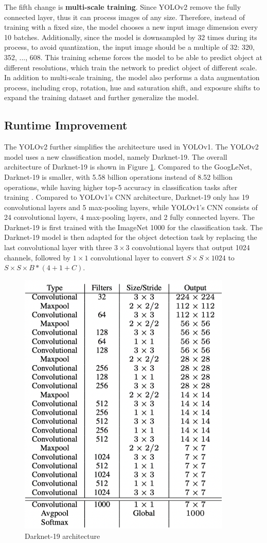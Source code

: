 The fifth change is \textbf{multi-scale training}. Since YOLOv2 remove the fully connected layer, thus it can process images of any size. Therefore, instead of training with a fixed size, the model chooses a new input image dimension every 10 batches. Additionally, since the model is downsampled by 32 times during its process, to avoid quantization, the input image should be a multiple of 32: {320, 352, ..., 608}. This training scheme forces the model to be able to predict object at different resolutions, which train the network to predict object of different scale. In addition to multi-scale training, the model also performs a data augmentation process, including crop, rotation, hue and saturation shift, and exposure shifts to expand the training dataset and further generalize the model.

\subsection{Runtime Improvement}
The YOLOv2 further simplifies the architecture used in YOLOv1. The YOLOv2 model uses a new classification model, namely Darknet-19. The overall architecture of Darknet-19 is shown in Figure \ref{fig:darknet19_archite}. Compared to the GoogLeNet, Darknet-19 is smaller, with 5.58 billion operations instead of 8.52 billion operations, while having higher top-5 accuracy in classification tasks after training \cite{yolo9000_2017}. Compared to YOLOv1's CNN architecture, Darknet-19 only has 19 convolutional layers and 5 max-pooling layers, while YOLOv1's CNN consists of 24 convolutional layers, 4 max-pooling layers, and 2 fully connected layers. The Darknet-19 is first trained with the ImageNet 1000 for the classification task. The Darknet-19 model is then adapted for the object detection task by replacing the last convolutional layer with three $3 \times 3$ convolutional layers that output 1024 channels, followed by $1 \times 1$ convolutional layer to convert $S \times S \times 1024$ to $S \times S \times B*(4+1+C)$.

\begin{figure}[!ht]
    \centering
    \includegraphics[width=4in]{figures/darknet19_archite.png}
    \caption{Darknet-19 architecture \cite{yolo9000_2017}} 
    \label{fig:darknet19_archite}
\end{figure}